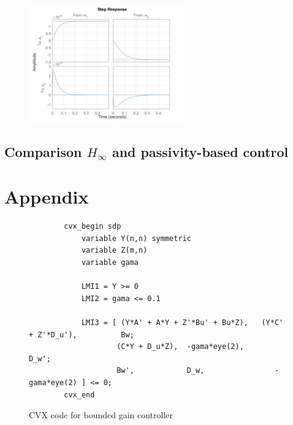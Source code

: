 \documentclass{article}
\begin{document}
\begin{figure}[H]
    \centering
    \includegraphics[width=0.6\textwidth]{figures/K_p_step.png}
    \caption{}
\end{figure}

\subsection{Comparison $H_\infty$ and passivity-based control}


\section{Appendix}


\begin{figure}[H]
    \centering
    \begin{lstlisting}
        cvx_begin sdp
            variable Y(n,n) symmetric
            variable Z(m,n)
            variable gama

            LMI1 = Y >= 0
            LMI2 = gama <= 0.1
            
            LMI3 = [ (Y*A' + A*Y + Z'*Bu' + Bu*Z),   (Y*C' + Z'*D_u'),          Bw;
                    (C*Y + D_u*Z),  -gama*eye(2),      D_w';
                    Bw',            D_w,                -gama*eye(2) ] <= 0;
        cvx_end
    \end{lstlisting}
    \caption{CVX code for bounded gain controller}
    \label{fig:bounded_lmi}
\end{figure}
\end{document}
